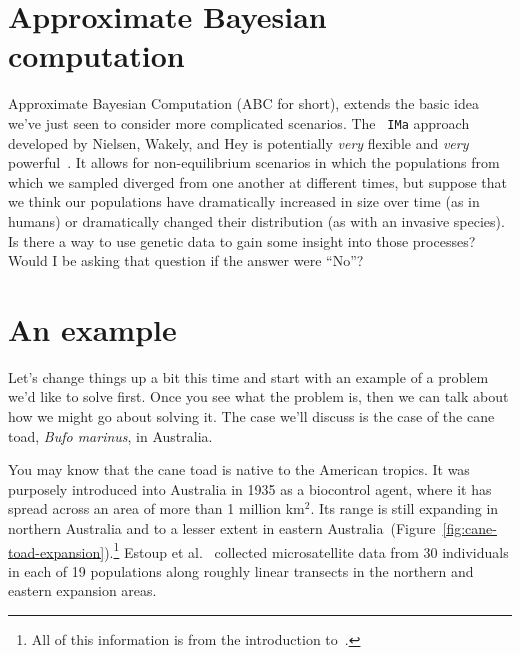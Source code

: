 \section*{Approximate Bayesian
  computation}

Approximate Bayesian Computation (ABC for short), extends the basic
idea we've just seen to consider more complicated scenarios. The {\tt
  IMa} approach developed by Nielsen, Wakely, and Hey is potentially
{\it very\/} flexible and {\it very\/}
powerful~\cite{Hey-Nielsen-2004,Hey-Nielsen-2007,Nielsen-Wakeley-2001}. It
allows for non-equilibrium scenarios in which the populations from
which we sampled diverged from one another at different times, but
suppose that we think our populations have dramatically increased in
size over time (as in humans) or dramatically changed their
distribution (as with an invasive species). Is there a way to use
genetic data to gain some insight into those processes? Would I be
asking that question if the answer were ``No''?

\section*{An example}

Let's change things up a bit this time and start with an example of a
problem we'd like to solve first. Once you see what the problem is,
then we can talk about how we might go about solving it. The case
we'll discuss is the case of the cane toad, {\it Bufo marinus}, in
Australia.

You may know that the cane toad is native to the American tropics. It
was purposely introduced into Australia in 1935 as a biocontrol agent,
where it has spread across an area of more than 1 million km$^2$. Its
range is still expanding in northern Australia and to a lesser extent
in eastern
Australia~(Figure~\ref{fig:cane-toad-expansion}).\footnote{All of this
  information is from the introduction to~\cite{Estoup-etal-2004}.}
Estoup et al.~\cite{Estoup-etal-2004} collected microsatellite data
from 30 individuals in each of 19 populations along roughly linear
transects in the northern and eastern expansion areas.

